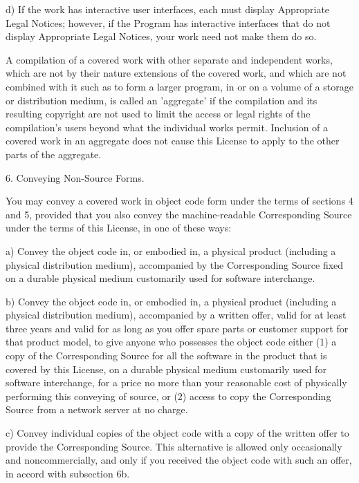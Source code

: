 \documentclass{article}
\begin{document}
    d) If the work has interactive user interfaces, each must display
    Appropriate Legal Notices; however, if the Program has interactive
    interfaces that do not display Appropriate Legal Notices, your
    work need not make them do so.

  A compilation of a covered work with other separate and independent
works, which are not by their nature extensions of the covered work,
and which are not combined with it such as to form a larger program,
in or on a volume of a storage or distribution medium, is called an
'aggregate' if the compilation and its resulting copyright are not
used to limit the access or legal rights of the compilation's users
beyond what the individual works permit.  Inclusion of a covered work
in an aggregate does not cause this License to apply to the other
parts of the aggregate.

  6. Conveying Non-Source Forms.

  You may convey a covered work in object code form under the terms
of sections 4 and 5, provided that you also convey the
machine-readable Corresponding Source under the terms of this License,
in one of these ways:

    a) Convey the object code in, or embodied in, a physical product
    (including a physical distribution medium), accompanied by the
    Corresponding Source fixed on a durable physical medium
    customarily used for software interchange.

    b) Convey the object code in, or embodied in, a physical product
    (including a physical distribution medium), accompanied by a
    written offer, valid for at least three years and valid for as
    long as you offer spare parts or customer support for that product
    model, to give anyone who possesses the object code either (1) a
    copy of the Corresponding Source for all the software in the
    product that is covered by this License, on a durable physical
    medium customarily used for software interchange, for a price no
    more than your reasonable cost of physically performing this
    conveying of source, or (2) access to copy the
    Corresponding Source from a network server at no charge.

    c) Convey individual copies of the object code with a copy of the
    written offer to provide the Corresponding Source.  This
    alternative is allowed only occasionally and noncommercially, and
    only if you received the object code with such an offer, in accord
    with subsection 6b.
\end{document}
